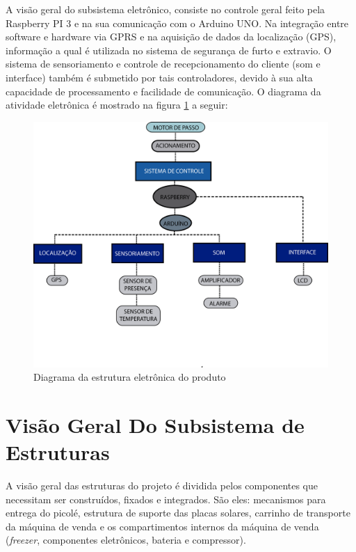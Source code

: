 A visão geral do subsistema eletrônico, consiste no controle geral feito pela Raspberry PI 3 e na sua comunicação com o Arduino UNO. Na integração entre software e hardware via GPRS e na aquisição de dados da localização (GPS), informação a qual é utilizada no sistema de segurança de furto e extravio. O sistema de sensoriamento e controle de recepcionamento do cliente (som e interface) também é submetido por tais controladores, devido à sua alta capacidade de processamento e facilidade de comunicação. O diagrama da atividade eletrônica é mostrado na figura \ref{fig:diagrama} a seguir:

\begin{figure}[H]
	\centering
    
    \includegraphics[width=1.05\textwidth]{figuras/diagrama}
    \caption{Diagrama da estrutura eletrônica do produto}
    \label{fig:diagrama}
\end{figure}


\section{Visão Geral Do Subsistema de Estruturas}

A visão geral das estruturas do projeto é dividida pelos componentes que necessitam ser construídos, fixados e integrados. São eles: mecanismos para entrega do picolé, estrutura de suporte das placas solares, carrinho de transporte da máquina de venda e os compartimentos internos da máquina de venda (\textit{freezer}, componentes eletrônicos, bateria e compressor).

